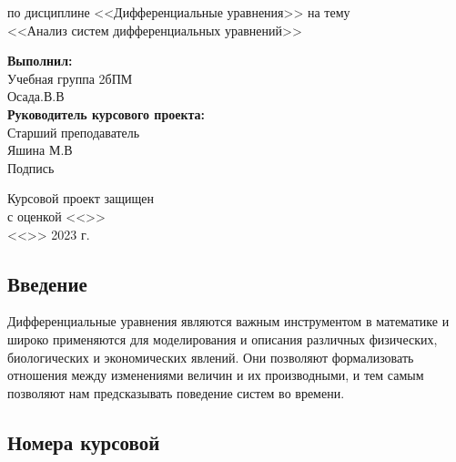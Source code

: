 \documentclass[12pt]{article}
\begin{document}
\begin{titlepage}
\begin{center}
        по дисциплине <<Дифференциальные уравнения>>
        на тему\\
        <<Анализ систем дифференциальных уравнений>>
   \end{center}
   
    \hfill \begin{minipage}{0.5\linewidth}
        \textbf{Выполнил:}\\
        Учебная группа 2бПМ\\
        Осада.В.В\\
        \textbf{Руководитель курсового проекта:
        }\\
        Старший преподаватель\\
       Яшина М.В\\
        Подпись \underline{\hspace{1cm}}\\
    \end{minipage}
    \vspace{1 cm}
   \begin{minipage}{0.45\linewidth}
        Курсовой проект защищен\\ с оценкой <<\underline{\hspace{1cm}}>>\\
        <<\underline{\hspace{0.7cm}}>> \underline{\hspace{2cm}} 2023 г.
    \end{minipage}
    \begin{minipage}{0.55\linewidth}
    \end{minipage}
    \vspace{5 cm}
\end{titlepage}

\tableofcontents
\newpage

\begin{center}
    \section{Введение}
    Дифференциальные уравнения являются важным инструментом в математике и широко применяются для моделирования и описания различных физических, биологических и экономических явлений. Они позволяют формализовать отношения между изменениями величин и их производными, и тем самым позволяют нам предсказывать поведение систем во времени.
\end{center}

\newpage
\begin{center}
\section{Номера курсовой}    
\end{center}
\end{document}
